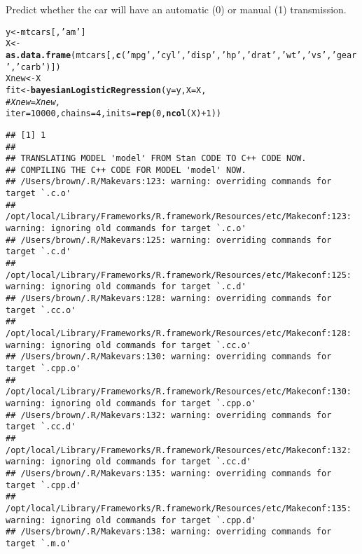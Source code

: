 \documentclass{article}\usepackage[]{graphicx}\usepackage[]{color}
\makeatletter
\newcommand{\hlnum}[1]{\textcolor[rgb]{0.686,0.059,0.569}{#1}}%
\newcommand{\hlstr}[1]{\textcolor[rgb]{0.192,0.494,0.8}{#1}}%
\newcommand{\hlcom}[1]{\textcolor[rgb]{0.678,0.584,0.686}{\textit{#1}}}%
\newcommand{\hlopt}[1]{\textcolor[rgb]{0,0,0}{#1}}%
\newcommand{\hlstd}[1]{\textcolor[rgb]{0.345,0.345,0.345}{#1}}%
\newcommand{\hlkwb}[1]{\textcolor[rgb]{0.69,0.353,0.396}{#1}}%
\newcommand{\hlkwc}[1]{\textcolor[rgb]{0.333,0.667,0.333}{#1}}%
\newcommand{\hlkwd}[1]{\textcolor[rgb]{0.737,0.353,0.396}{\textbf{#1}}}%
\newenvironment{kframe}{%
 \def\at@end@of@kframe{}%
 \ifinner\ifhmode%
  \def\at@end@of@kframe{\end{minipage}}%
  \begin{minipage}{\columnwidth}%
 \fi\fi%
 \def\FrameCommand##1{\hskip\@totalleftmargin \hskip-\fboxsep
 \colorbox{shadecolor}{##1}\hskip-\fboxsep
     \hskip-\linewidth \hskip-\@totalleftmargin \hskip\columnwidth}%
 \MakeFramed {\advance\hsize-\width
   \@totalleftmargin\z@ \linewidth\hsize
   \@setminipage}}%
 {\par\unskip\endMakeFramed%
 \at@end@of@kframe}
\newenvironment{knitrout}{}{} %
\makeatother
\begin{document}
Predict whether the car will have an automatic (0) or manual (1) transmission.

\begin{knitrout}
\color{fgcolor}\begin{kframe}
\begin{alltt}
\hlstd{y} \hlkwb{<-} \hlstd{mtcars[,}\hlstr{'am'}\hlstd{]}
\hlstd{X} \hlkwb{<-} \hlkwd{as.data.frame}\hlstd{(mtcars[,}\hlkwd{c}\hlstd{(}\hlstr{'mpg'}\hlstd{,} \hlstr{'cyl'}\hlstd{,} \hlstr{'disp'}\hlstd{,} \hlstr{'hp'}\hlstd{,} \hlstr{'drat'}\hlstd{,} \hlstr{'wt'}\hlstd{,} \hlstr{'vs'}\hlstd{,} \hlstr{'gear'}\hlstd{,} \hlstr{'carb'}\hlstd{)])}
\hlstd{Xnew} \hlkwb{<-} \hlstd{X}
\hlstd{fit} \hlkwb{<-} \hlkwd{bayesianLogisticRegression}\hlstd{(}\hlkwc{y}\hlstd{=y,} \hlkwc{X}\hlstd{=X,}
                                  \hlcom{# Xnew=Xnew,}
                                  \hlkwc{iter}\hlstd{=}\hlnum{10000}\hlstd{,} \hlkwc{chains}\hlstd{=}\hlnum{4}\hlstd{,} \hlkwc{inits}\hlstd{=}\hlkwd{rep}\hlstd{(}\hlnum{0}\hlstd{,}\hlkwd{ncol}\hlstd{(X)}\hlopt{+}\hlnum{1}\hlstd{))}
\end{alltt}
\begin{verbatim}
## [1] 1
## 
## TRANSLATING MODEL 'model' FROM Stan CODE TO C++ CODE NOW.
## COMPILING THE C++ CODE FOR MODEL 'model' NOW.
## /Users/brown/.R/Makevars:123: warning: overriding commands for target `.c.o'
## /opt/local/Library/Frameworks/R.framework/Resources/etc/Makeconf:123: warning: ignoring old commands for target `.c.o'
## /Users/brown/.R/Makevars:125: warning: overriding commands for target `.c.d'
## /opt/local/Library/Frameworks/R.framework/Resources/etc/Makeconf:125: warning: ignoring old commands for target `.c.d'
## /Users/brown/.R/Makevars:128: warning: overriding commands for target `.cc.o'
## /opt/local/Library/Frameworks/R.framework/Resources/etc/Makeconf:128: warning: ignoring old commands for target `.cc.o'
## /Users/brown/.R/Makevars:130: warning: overriding commands for target `.cpp.o'
## /opt/local/Library/Frameworks/R.framework/Resources/etc/Makeconf:130: warning: ignoring old commands for target `.cpp.o'
## /Users/brown/.R/Makevars:132: warning: overriding commands for target `.cc.d'
## /opt/local/Library/Frameworks/R.framework/Resources/etc/Makeconf:132: warning: ignoring old commands for target `.cc.d'
## /Users/brown/.R/Makevars:135: warning: overriding commands for target `.cpp.d'
## /opt/local/Library/Frameworks/R.framework/Resources/etc/Makeconf:135: warning: ignoring old commands for target `.cpp.d'
## /Users/brown/.R/Makevars:138: warning: overriding commands for target `.m.o'

\end{verbatim}
\end{kframe}
\end{knitrout}
\end{document}
